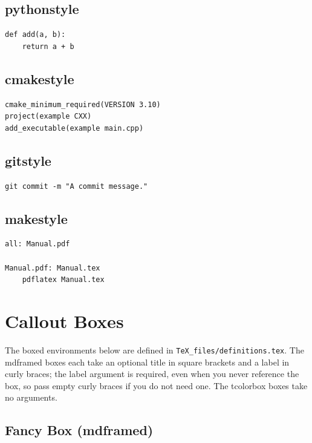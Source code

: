 \subsection{pythonstyle}

\begin{lstlisting}[style=pythonstyle]
def add(a, b):
    return a + b
\end{lstlisting}

\subsection{cmakestyle}

\begin{lstlisting}[style=cmakestyle]
cmake_minimum_required(VERSION 3.10)
project(example CXX)
add_executable(example main.cpp)
\end{lstlisting}

\subsection{gitstyle}

\begin{lstlisting}[style=gitstyle]
git commit -m "A commit message."
\end{lstlisting}

\subsection{makestyle}

\begin{lstlisting}[style=makestyle]
all: Manual.pdf

Manual.pdf: Manual.tex
	pdflatex Manual.tex
\end{lstlisting}

\section{Callout Boxes}

The boxed environments below are defined in \texttt{TeX\_files/definitions.tex}. The mdframed boxes each take an optional title in square brackets and a label in curly braces; the label argument is required, even when you never reference the box, so pass empty curly braces if you do not need one. The tcolorbox boxes take no arguments.

\subsection{Fancy Box (mdframed)}


